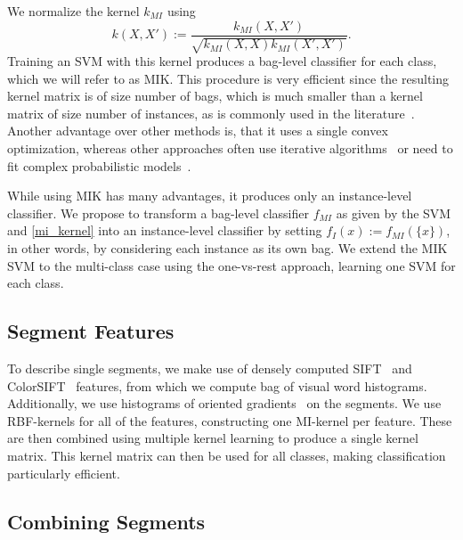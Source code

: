 We normalize the kernel $k_{MI}$ \citep{gaertner2002multi} using
\begin{equation}
k(X,X') := \frac{k_{MI}(X,X')}{\sqrt{k_{MI}(X,X)k_{MI}(X',X')}}.
\end{equation}
Training an SVM with this kernel produces a bag-level classifier for each
class, which we will refer to as MIK\@.  This procedure is very efficient since
the resulting kernel matrix is of size number of bags, which is much smaller
than a kernel matrix of size number of instances, as is commonly used in the
literature~\citep{andrews2003support,nguyen2010new,zhang2008m3miml}.  Another
advantage over other methods is, that it uses a single convex optimization,
whereas other approaches often use iterative
algorithms~\citep{andrews2003support} or need to fit complex probabilistic
models~\citep{zha2008joint}.

While using MIK has many advantages, it produces only an instance-level
classifier. We propose to transform a bag-level classifier $f_{MI}$ as given by
the SVM and \eqref{mi_kernel} into an instance-level classifier by setting
$f_{I}(x):=f_{MI}(\{x\})$, in other words, by considering each instance as its own
bag. 
We extend the MIK SVM to the multi-class case using the one-vs-rest approach,
learning one SVM for each class.

\subsection{Segment Features}

To describe single segments, we make use of densely computed
SIFT~\citep{lowe2004distinctive} and ColorSIFT~\citep{van2009evaluating}
features, from which we compute bag of visual word histograms. Additionally, we
use histograms of oriented gradients~\citep{dalal2005histograms} on the
segments.  We use RBF-kernels for all of the features, constructing one
MI-kernel per feature. These are then combined using multiple kernel learning
to produce a single kernel matrix. This kernel matrix can then be used for all
classes, making classification particularly efficient.

\subsection{Combining Segments}

